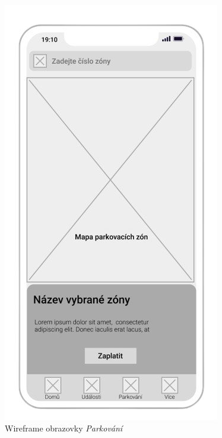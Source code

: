 \begin{minipage}[t]{0.45\textwidth}
  \begin{figure}[H]
    \centering
    \includegraphics[width=.7\textwidth]{parking_wireframe.png}
    \caption{Wireframe obrazovky \textit{Parkování}}
    \label{fig:wireframe3}
  \end{figure}
  \begin{figure}[H]
    \centering

\end{figure}
\end{minipage}
